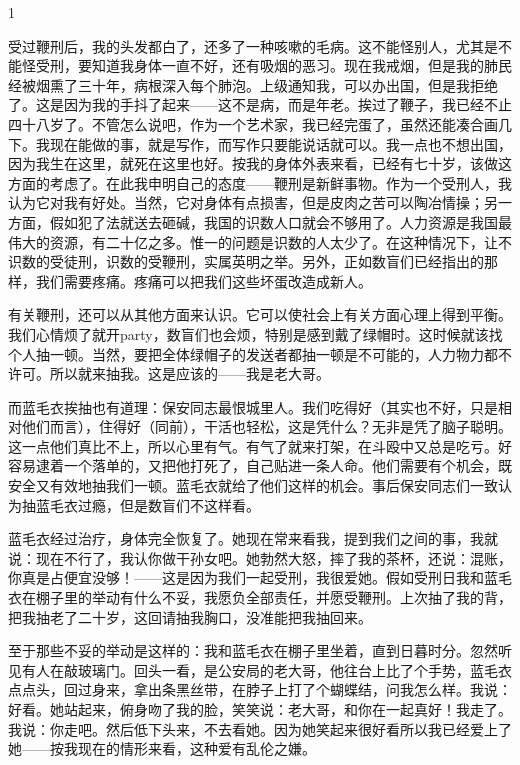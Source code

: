 1 

受过鞭刑后，我的头发都白了，还多了一种咳嗽的毛病。这不能怪别人，尤其是不能怪受刑，要知道我身体一直不好，还有吸烟的恶习。现在我戒烟，但是我的肺民经被烟熏了三十年，病根深入每个肺泡。上级通知我，可以办出国，但是我拒绝了。这是因为我的手抖了起来——这不是病，而是年老。挨过了鞭子，我已经不止四十八岁了。不管怎么说吧，作为一个艺术家，我已经完蛋了，虽然还能凑合画几下。我现在能做的事，就是写作，而写作只要能说话就可以。我一点也不想出国，因为我生在这里，就死在这里也好。按我的身体外表来看，已经有七十岁，该做这方面的考虑了。在此我申明自己的态度——鞭刑是新鲜事物。作为一个受刑人，我认为它对我有好处。当然，它对身体有点损害，但是皮肉之苦可以陶冶情操；另一方面，假如犯了法就送去砸碱，我国的识数人口就会不够用了。人力资源是我国最伟大的资源，有二十亿之多。惟一的问题是识数的人太少了。在这种情况下，让不识数的受徒刑，识数的受鞭刑，实属英明之举。另外，正如数盲们已经指出的那样，我们需要疼痛。疼痛可以把我们这些坏蛋改造成新人。 

有关鞭刑，还可以从其他方面来认识。它可以使社会上有关方面心理上得到平衡。我们心情烦了就开party，数盲们也会烦，特别是感到戴了绿帽时。这时候就该找个人抽一顿。当然，要把全体绿帽子的发送者都抽一顿是不可能的，人力物力都不许可。所以就来抽我。这是应该的——我是老大哥。 

而蓝毛衣挨抽也有道理：保安同志最恨城里人。我们吃得好（其实也不好，只是相对他们而言），住得好（同前），干活也轻松，这是凭什么？无非是凭了脑子聪明。这一点他们真比不上，所以心里有气。有气了就来打架，在斗殴中又总是吃亏。好容易逮着一个落单的，又把他打死了，自己贴进一条人命。他们需要有个机会，既安全又有效地抽我们一顿。蓝毛衣就给了他们这样的机会。事后保安同志们一致认为抽蓝毛衣过瘾，但是数盲们不这样看。 



蓝毛衣经过治疗，身体完全恢复了。她现在常来看我，提到我们之间的事，我就说：现在不行了，我认你做干孙女吧。她勃然大怒，摔了我的茶杯，还说：混账，你真是占便宜没够！——这是因为我们一起受刑，我很爱她。假如受刑日我和蓝毛衣在棚子里的举动有什么不妥，我愿负全部责任，并愿受鞭刑。上次抽了我的背，把我抽老了二十岁，这回请抽我胸口，没准能把我抽回来。 

至于那些不妥的举动是这样的：我和蓝毛衣在棚子里坐着，直到日暮时分。忽然听见有人在敲玻璃门。回头一看，是公安局的老大哥，他往台上比了个手势，蓝毛衣点点头，回过身来，拿出条黑丝带，在脖子上打了个蝴蝶结，问我怎么样。我说：好看。她站起来，俯身吻了我的脸，笑笑说：老大哥，和你在一起真好！我走了。我说：你走吧。然后低下头来，不去看她。因为她笑起来很好看所以我已经爱上了她——按我现在的情形来看，这种爱有乱伦之嫌。 

